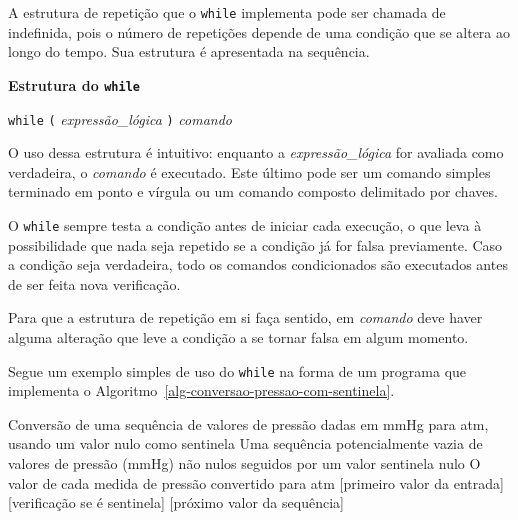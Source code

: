 \documentclass[
  11pt,
  a4paper,
]{scrbook}
\begin{document}
A estrutura de repetição que o \texttt{while} implementa pode ser
chamada de indefinida, pois o número de repetições depende de uma
condição que se altera ao longo do tempo. Sua estrutura é apresentada na
sequência.


\begin{tcolorbox}[enhanced jigsaw, colback=white, arc=.35mm, colframe=quarto-callout-color-frame, toprule=.15mm, leftrule=.75mm, left=2mm, rightrule=.15mm, bottomrule=.15mm, opacityback=0, breakable]

\vspace{-3mm}\textbf{Estrutura do \texttt{while}}\vspace{3mm}

\texttt{while} \texttt{(} \emph{expressão\_lógica} \texttt{)}
\emph{comando}

\end{tcolorbox}

O uso dessa estrutura é intuitivo: enquanto a \emph{expressão\_lógica}
for avaliada como verdadeira, o \emph{comando} é executado. Este último
pode ser um comando simples terminado em ponto e vírgula ou um comando
composto delimitado por chaves.

O \texttt{while} sempre testa a condição antes de iniciar cada execução,
o que leva à possibilidade que nada seja repetido se a condição já for
falsa previamente. Caso a condição seja verdadeira, todo os comandos
condicionados são executados antes de ser feita nova verificação.

Para que a estrutura de repetição em si faça sentido, em \emph{comando}
deve haver alguma alteração que leve a condição a se tornar falsa em
algum momento.

Segue um exemplo simples de uso do \texttt{while} na forma de um
programa que implementa o
Algoritmo~\ref{alg-conversao-pressao-com-sentinela}.

\begin{algorithm}[H]
\caption{\label{alg-conversao-pressao-com-sentinela}Conversão de
unidades de pressão para uma sequência de valores.}
\begingroup%

\begin{algorithmic}
    \Description Conversão de uma sequência de valores de pressão dadas em mmHg para atm, usando um valor nulo como sentinela
    \Require Uma sequência potencialmente vazia de valores de pressão (mmHg) não nulos seguidos por um valor sentinela nulo
    \Ensure O valor de cada medida de pressão convertido para atm
    \Statex{}
    [primeiro valor da entrada]
    [verificação se é sentinela]
        \Statex
        [próximo valor da sequência]
    \EndWhile
\end{algorithmic}

\endgroup
\end{algorithm}
\end{document}
